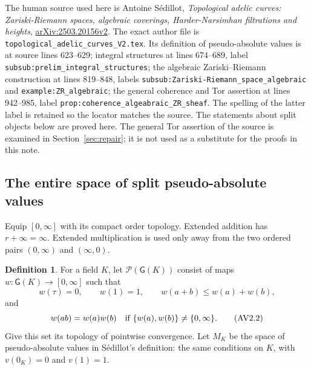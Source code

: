 \documentclass[11pt,a4paper]{article}
\theoremstyle{definition}\newtheorem{definition}[theorem]{Definition}
\newcommand{\G}{\mathsf G}\newcommand{\Tor}{\operatorname{Tor}}\newcommand{\Frac}{\operatorname{Frac}}
\begin{document}
The human source used here is Antoine S\'edillot,
\emph{Topological adelic curves: Zariski-Riemann spaces, algebraic coverings,
Harder-Narsimhan filtrations and heights},
\href{https://arxiv.org/abs/2503.20156v2}{arXiv:2503.20156v2}.
The exact author file is \nolinkurl{topological_adelic_curves_V2.tex}.
Its definition of pseudo-absolute values is at source lines 623--629;
integral structures at lines 674--689, label
\nolinkurl{subsub:prelim_integral_structures}; the algebraic
Zariski--Riemann construction at lines 819--848, labels
\nolinkurl{subsub:Zariski-Riemann_space_algebraic} and
\nolinkurl{example:ZR_algebraic}; the general coherence and Tor assertion
at lines 942--985, label
\nolinkurl{prop:coherence_algeabraic_ZR_sheaf}.
The spelling of the latter label is retained so the locator matches the
source. The statements about split objects below are proved here. The
general Tor assertion of the source is examined in Section~\ref{sec:repair};
it is not used as a substitute for the proofs in this note.

\subsection{The entire space of split pseudo-absolute values}

Equip $[0,\infty]$ with its compact order topology. Extended addition has
$r+\infty=\infty$. Extended multiplication is used only away from the two
ordered pairs $(0,\infty)$ and $(\infty,0)$.

\begin{definition}
For a field $K$, let $\mathcal P(\G(K))$ consist of maps
$w:\G(K)\to[0,\infty]$ such that
\[
 w(\tau)=0,\qquad w(1)=1,\qquad
 w(a+b)\le w(a)+w(b),
 \tag{AV2.1}\label{eq:split-pav}
\]
and
\[
 w(ab)=w(a)w(b)\quad\hbox{if }
 \{w(a),w(b)\}\ne\{0,\infty\}.
 \tag{AV2.2}\label{eq:partial-mult}
\]
Give this set its topology of pointwise convergence. Let $M_K$ be the
space of pseudo-absolute values in S\'edillot's definition: the same
conditions on $K$, with $v(0_K)=0$ and $v(1)=1$.
\end{definition}
\end{document}
